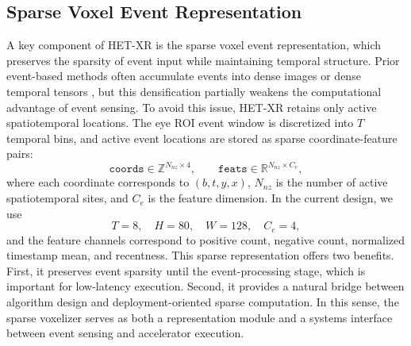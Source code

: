 \documentclass[journal]{IEEEtran}
\begin{document}
\subsection{Sparse Voxel Event Representation}
A key component of HET-XR is the sparse voxel event representation, which preserves the sparsity of event input while maintaining temporal structure. Prior event-based methods often accumulate events into dense images or dense temporal tensors \cite{chen20233et,li2023track,li2024gaze}, but this densification partially weakens the computational advantage of event sensing. To avoid this issue, HET-XR retains only active spatiotemporal locations.
%
The eye ROI event window is discretized into $T$ temporal bins, and active event locations are stored as sparse coordinate-feature pairs:
\begin{equation}
\texttt{coords} \in \mathbb{Z}^{N_{nz}\times 4}, \qquad
\texttt{feats} \in \mathbb{R}^{N_{nz}\times C_e},
\end{equation}
where each coordinate corresponds to $(b,t,y,x)$, $N_{nz}$ is the number of active spatiotemporal sites, and $C_e$ is the feature dimension. In the current design, we use
\begin{equation}
T = 8,\quad H = 80,\quad W = 128,\quad C_e = 4,
\end{equation}
%
and the feature channels correspond to positive count, negative count, normalized timestamp mean, and recentness.
%
This sparse representation offers two benefits. First, it preserves event sparsity until the event-processing stage, which is important for low-latency execution. Second, it provides a natural bridge between algorithm design and deployment-oriented sparse computation. In this sense, the sparse voxelizer serves as both a representation module and a systems interface between event sensing and accelerator execution.
\end{document}
